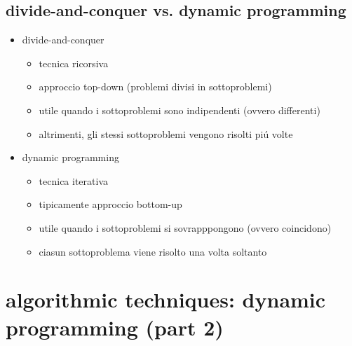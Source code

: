 
\subsection*{divide-and-conquer vs. dynamic programming}
\begin{flushleft}
	\begin{itemize}
		\item divide-and-conquer
		\begin{itemize}
			\item tecnica ricorsiva
			\item approccio top-down (problemi divisi in sottoproblemi)
			\item utile quando i sottoproblemi sono indipendenti (ovvero differenti)
			\item altrimenti, gli stessi sottoproblemi vengono risolti pi\'u volte
		\end{itemize}
		\item dynamic programming
		\begin{itemize}
			\item tecnica iterativa
			\item tipicamente approccio bottom-up
			\item utile quando i sottoproblemi si sovrapppongono (ovvero coincidono)
			\item ciasun sottoproblema viene risolto una volta soltanto
		\end{itemize}
	\end{itemize}
\end{flushleft}


\section*{algorithmic techniques: dynamic programming (part 2)}


